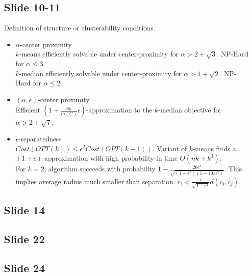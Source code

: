 \documentclass[12pt]{article}
\begin{document}
\subsection*{Slide 10-11}
Definition of structure or clusterability conditions.
	\begin{itemize}
		\item $\alpha$-center proximity\\
		$k$-means efficiently solvable under center-proximity for $\alpha > 2 + \sqrt{3}$. NP-Hard for $\alpha \le 3$.\\
		 $k$-median efficiently solvable under center-proximity for $\alpha > 1 + \sqrt{2}$. NP-Hard for $\alpha \le 2$
		 
		 \item $(\alpha, \epsilon)$-center proximity\\
		 Efficient $(1+\frac{8n}{m(C)}\epsilon)$-approximation to the $k$-median objective for $\alpha > 2 + \sqrt{7}$.
		 
		 \item $\epsilon$-separatedness\\
		 $Cost(OPT(k)) \le \epsilon^2 Cost(OPT(k-1))$. Variant of $k$-means finds a $(1+\epsilon)$-approximation with high probability in time $O(nk+k^3)$. \\
		 For $k=2$, algorithm succeeds with probability $1-\frac{20\epsilon^2}{\sqrt{(1-\epsilon^2)(1-101\epsilon^2)}}$. This implies average radius much smaller than separation.
		 $r_i < \frac{\epsilon}{\sqrt{1-\epsilon^2}} d(c_i, c_j)$.  
	\end{itemize}

\subsection*{Slide 14}
\subsection*{Slide 22}
\subsection*{Slide 24}
\end{document}
